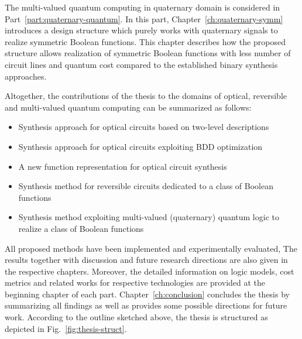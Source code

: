 \documentclass[10pt,letterpaper,twoside,openright]{book}
\begin{document}
The multi-valued quantum computing in quaternary domain is considered in Part~\ref{part:quaternary-quantum}. In this part, Chapter~\ref{ch:quaternary-symm} introduces a design structure which purely works with quaternary signals to realize symmetric Boolean functions. This chapter describes how the proposed structure allows realization of symmetric Boolean functions with less number of circuit lines and quantum cost compared to the established binary synthesis approaches.

Altogether, the contributions of the thesis to the domains of optical, reversible and multi-valued quantum computing can be summarized as follows:
\begin{itemize}
\item Synthesis approach for optical circuits based on two-level descriptions
\item Synthesis approach for optical circuits exploiting BDD optimization
\item A new function representation for optical circuit synthesis
\item Synthesis method for reversible circuits dedicated to a class of Boolean functions
\item Synthesis method exploiting multi-valued (quaternary) quantum logic to realize a class of Boolean functions
\end{itemize}          

All proposed methods have been implemented and experimentally evaluated, The results together with discussion and future research directions are also given in the respective chapters. Moreover, the detailed information on logic models, cost metrics and related works for respective technologies are provided at the beginning chapter of each part. Chapter~\ref{ch:conclusion} concludes the thesis by summarizing all findings as well as provides some possible directions for future work. According to the outline sketched above, the thesis is structured as depicted in Fig.~\ref{fig:thesis-struct}.
\end{document}
